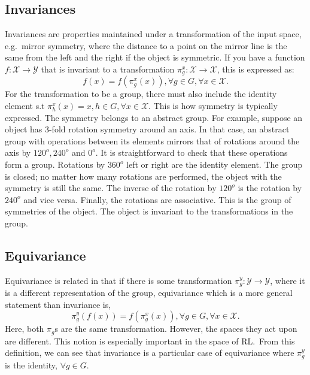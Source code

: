 \subsection{Invariances}
Invariances are properties maintained under a transformation of the input space, e.g.\ mirror symmetry, where the distance to a point on the mirror line is the same from the left and the right if the object is symmetric. If you have a function $f: \mathcal{X} \rightarrow \mathcal{Y}$ that is invariant to a transformation $\pi_g^x: \mathcal{X} \rightarrow \mathcal{X}$, this is expressed as:
\begin{equation}
	f(x) = f(\pi_g^x (x)),   \forall g \in G, \forall x \in \mathcal{X}.
\end{equation}
For the transformation to be a group, there must also include the identity element s.t $\pi_h^x(x) = x,  h \in G, \forall x\in \mathcal{X}$. This is how symmetry is typically expressed. The symmetry belongs to an abstract group. For example, suppose an object has 3-fold rotation symmetry around an axis. In that case, an abstract group with operations between its elements mirrors that of rotations around the axis by $120^o, 240^o$ and $0^o$. It is straightforward to check that these operations form a group. Rotations by $360^o$ left or right are the identity element. The group is closed; no matter how many rotations are performed, the object with the symmetry is still the same. The inverse of the rotation by $120^o$ is the rotation by $240^o$ and vice versa. Finally, the rotations are associative. This is the group of symmetries of the object. The object is invariant to the transformations in the group.

\subsection{Equivariance}
Equivariance is related in that if there is some transformation $\pi_g^y: \mathcal{Y} \rightarrow \mathcal{Y}$, where it is a different representation of the group, equivariance which is a more general statement than invariance is,
\begin{equation}
	\pi_g^y( f(x) )= f(\pi_g^x( x)), \forall g \in G, \forall x \in \mathcal{X}.
\end{equation}
Here, both $\pi_g$s are the same transformation. However, the spaces they act upon are different. This notion is especially important in the space of RL.\ From this definition, we can see that invariance is a particular case of equivariance where $\pi^y_g$ is the identity, $\forall g \in G$.

